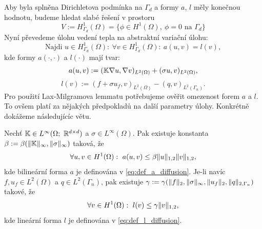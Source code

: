Aby byla splněna Dirichletova podmínka na $\Gamma_d$ a formy $a$, $l$ měly konečnou hodnotu, 
budeme hledat slabé řešení v prostoru 
\[
    V:=H^1_{\Gamma_d}(\Omega) = \{ \phi \in H^1(\Omega),\ \phi = 0\text{ na }\Gamma_d\} 
\]
Nyní převedeme úlohu vedení tepla na abstraktní variační úlohu:
\[ 
    \mbox{Najdi }u\in H^1_{\Gamma_d}(\Omega):~\forall v\in H^1_{\Gamma_d}(\Omega):~a(u,v)=l(v), 
\]
kde formy $a(\cdot, \cdot)$ a $l(\cdot)$ mají tvar:
\begin{equation}\label{eq:def_a_diffusion}
    a(u,v) := ({\mathbb{K}}\nabla u, \nabla v)_{L^2(\Omega)} + (\sigma u, v)_{L^2(\Omega)},
\end{equation}
\begin{equation}\label{eq:def_l_diffusion}
    l(v) := (f + \sigma u_f,v)_{L^2(\Omega)} - ( q, v)_{L^2(\Gamma_n)}.
\end{equation}
Pro použití Lax-Milgramova lemmatu potřebujeme ověřit omezenost forem $a$ a $l$. To ovšem platí 
za nějakých předpokladů na další parametry úlohy. Konkrétně dokážeme následujícíc větu.
\begin{veta}
    Nechť ${\mathbb{K}}\in L^\infty(\Omega;~\mathbb R^{d\times d})$ a $\sigma\in L^\infty(\Omega)$. 
    Pak existuje konstanta $\beta:=\beta(\|{\mathbb{K}}\|_\infty,\|\sigma\|_\infty)$ taková, že
    \[ 
        \forall u,v\in H^1(\Omega):~a(u,v) \le \beta \|u\|_{1,2}\|v\|_{1,2}, 
    \]
    kde bilineární forma $a$ je definována v \eqref{eq:def_a_diffusion}.
    Je-li navíc $f,u_f\in L^2(\Omega)$ a $q\in L^2(\Gamma_n)$, pak existuje 
    $\gamma:=\gamma(\|f\|_2,\|\sigma\|_\infty,\|u_f\|_2,\|q\|_{2,\Gamma_n})$ takové, že
    \[ 
        \forall v\in H^1(\Omega):~l(v) \le \gamma\|v\|_{1,2}, 
    \]
    kde lineární forma $l$ je definována v \eqref{eq:def_l_diffusion}.
\end{veta}
